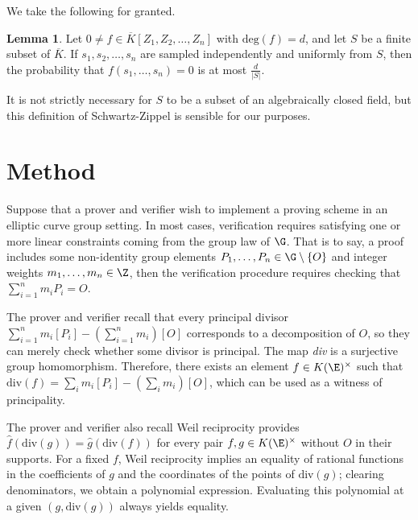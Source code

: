 \documentclass[11pt,letterpaper]{article}
\theoremstyle{definition}
\newtheorem{lemm}[theorem]{Lemma}
\newcommand{\6}{\mathbf}
\newcommand{\7}{\mathcal}
\begin{document}
We take the following for granted.

\begin{lemm}
Let $0 \neq f \in \overline{K}[Z_1, Z_2, \ldots, Z_n]$ with $\text{deg}(f) = d$, and let $S$ be a finite subset of $\overline{K}$. If $s_1, s_2, \ldots, s_n$ are sampled independently and uniformly from $S$, then the probability that $f(s_1, \ldots, s_n)=0$ is at most $\frac{d}{\left|S\right|}$.
\end{lemm}

It is not strictly necessary for $S$ to be a subset of an algebraically closed field, but this definition of Schwartz-Zippel is sensible for our purposes.



\section{Method}

Suppose that a prover and verifier wish to implement a proving scheme in an elliptic curve group setting. In most cases, verification requires satisfying one or more linear constraints coming from the group law of $\G$. That is to say, a proof includes some non-identity group elements $P_1, \ldots, P_n \in \G \setminus \left\{O\right\}$ and integer weights $m_1, \ldots, m_n \in \Z$, then the verification procedure requires checking that $\sum_{i=1}^{n} m_i P_i = O$.

The prover and verifier recall that every principal divisor $\sum_{i=1}^{n} m_i [P_i] - (\sum_{i=1}^{n} m_i)[O]$ corresponds to a decomposition of $O$, so they can merely check whether some divisor  is principal.
The map \textit{div} is a surjective group homomorphism. Therefore, there exists an element $f \in K(\E)^\times$ such that $\text{div}(f) = \sum_i m_i [P_i] - \left(\sum_i m_i\right)[O]$, which can be used as a witness of principality.


The prover and verifier also recall Weil reciprocity provides $\widehat{f}(\text{div}(g)) = \widehat{g}(\text{div}(f))$ for every pair $f, g \in K(\E)^\times$ without $O$ in their supports. For a fixed $f$, Weil reciprocity implies an equality of rational functions in the coefficients of $g$ and the coordinates of the points of $\text{div}(g)$; clearing denominators, we obtain a polynomial expression. Evaluating this polynomial at a given $(g, \text{div}(g))$ always yields equality. 
\end{document}
